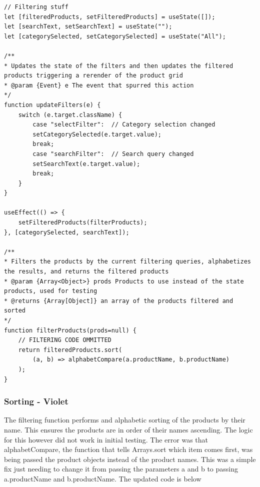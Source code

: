 \documentclass{article}[12pt]
\begin{document}
\begin{lstlisting}
// Filtering stuff
let [filteredProducts, setFilteredProducts] = useState([]); 
let [searchText, setSearchText] = useState("");
let [categorySelected, setCategorySelected] = useState("All");

/**
* Updates the state of the filters and then updates the filtered products triggering a rerender of the product grid
* @param {Event} e The event that spurred this action 
*/
function updateFilters(e) {
    switch (e.target.className) {
        case "selectFilter":  // Category selection changed 
        setCategorySelected(e.target.value);
        break;
        case "searchFilter":  // Search query changed
        setSearchText(e.target.value);
        break;
    }
}

useEffect(() => {
    setFilteredProducts(filterProducts);
}, [categorySelected, searchText]);

/**
* Filters the products by the current filtering queries, alphabetizes the results, and returns the filtered products
* @param {Array<Object>} prods Products to use instead of the state products, used for testing
* @returns {Array[Object]} an array of the products filtered and sorted
*/
function filterProducts(prods=null) {
    // FILTERING CODE OMMITTED
    return filteredProducts.sort(
        (a, b) => alphabetCompare(a.productName, b.productName)
    );
}

\end{lstlisting}

\subsubsection{Sorting - Violet}
The filtering function performs and alphabetic sorting of the products by their name. This ensures the products are in order of their names ascending. The logic for this however did not work in initial testing. The error was that alphabetCompare, the function that tells Arrays.sort which item comes first, was being passed the product objects instead of the product names. This was a simple fix just needing to change it from passing the parameters a and b to passing a.productName and b.productName. The updated code is below
\end{document}

